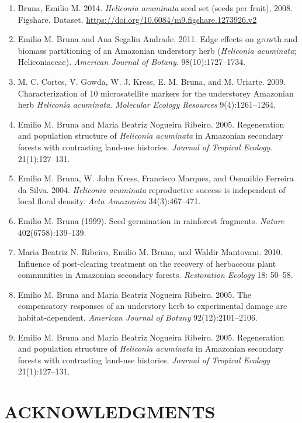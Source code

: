 \documentclass[
  12pt,
  man, donotrepeattitle]{apa6}
\begin{document}
\begin{enumerate}
\def\labelenumi{\arabic{enumi}.}
\item
  Bruna, Emilio M. 2014. \emph{Heliconia acuminata} seed set (seeds per fruit), 2008. Figshare. Dataset. \url{https://doi.org/10.6084/m9.figshare.1273926.v2}
\item
  Emilio M. Bruna and Ana Segalin Andrade. 2011. Edge effects on growth and biomass partitioning of an Amazonian understory herb (\emph{Heliconia acuminata}; Heliconiaceae). \emph{American Journal of Botany}. 98(10):1727--1734.
\item
  M. C. Cortes, V. Gowda, W. J. Kress, E. M. Bruna, and M. Uriarte. 2009. Characterization of 10 microsatellite markers for the understorey Amazonian herb \emph{Heliconia acuminata}. \emph{Molecular Ecology Resources} 9(4):1261--1264.
\item
  Emilio M. Bruna and Maria Beatriz Nogueira Ribeiro. 2005. Regeneration and population structure of \emph{Heliconia acuminata} in Amazonian secondary forests with contrasting land-use histories. \emph{Journal of Tropical Ecology}. 21(1):127--131.
\item
  Emilio M. Bruna, W. John Kress, Francisco Marques, and Osmaildo Ferreira da Silva. 2004. \emph{Heliconia acuminata} reproductive success is independent of local floral density. \emph{Acta Amazonica} 34(3):467--471.
\item
  Emilio M. Bruna (1999). Seed germination in rainforest fragments. \emph{Nature} 402(6758):139--139.
\item
  Maria Beatriz N. Ribeiro, Emilio M. Bruna, and Waldir Mantovani. 2010. Influence of post-clearing treatment on the recovery of herbaceous plant communities in Amazonian secondary forests. \emph{Restoration Ecology} 18: 50--58.
\item
  Emilio M. Bruna and Maria Beatriz Nogueira Ribeiro. 2005. The compensatory responses of an understory herb to experimental damage are habitat‐dependent. \emph{American Journal of Botany} 92(12):2101--2106.
\item
  Emilio M. Bruna and Maria Beatriz Nogueira Ribeiro. 2005. Regeneration and population structure of \emph{Heliconia acuminata} in Amazonian secondary forests with contrasting land-use histories. \emph{Journal of Tropical Ecology} 21(1):127--131.
\end{enumerate}

\hypertarget{acknowledgments}{%
\section{ACKNOWLEDGMENTS}\label{acknowledgments}}
\end{document}
